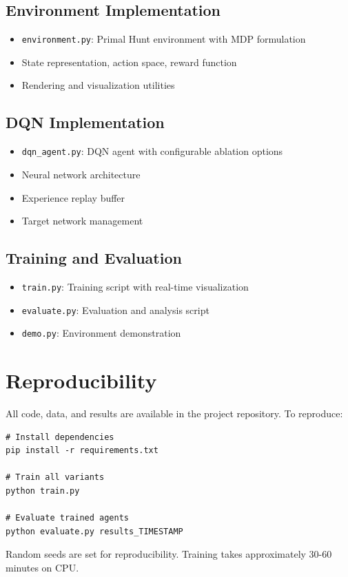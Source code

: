 \documentclass[12pt,a4paper]{article}
\begin{document}
\subsection{Environment Implementation}
\begin{itemize}
    \item \texttt{environment.py}: Primal Hunt environment with MDP formulation
    \item State representation, action space, reward function
    \item Rendering and visualization utilities
\end{itemize}

\subsection{DQN Implementation}
\begin{itemize}
    \item \texttt{dqn\_agent.py}: DQN agent with configurable ablation options
    \item Neural network architecture
    \item Experience replay buffer
    \item Target network management
\end{itemize}

\subsection{Training and Evaluation}
\begin{itemize}
    \item \texttt{train.py}: Training script with real-time visualization
    \item \texttt{evaluate.py}: Evaluation and analysis script
    \item \texttt{demo.py}: Environment demonstration
\end{itemize}

\section{Reproducibility}

All code, data, and results are available in the project repository. To reproduce:

\begin{verbatim}
# Install dependencies
pip install -r requirements.txt

# Train all variants
python train.py

# Evaluate trained agents
python evaluate.py results_TIMESTAMP
\end{verbatim}

Random seeds are set for reproducibility. Training takes approximately 30-60 minutes on CPU.
\end{document}
